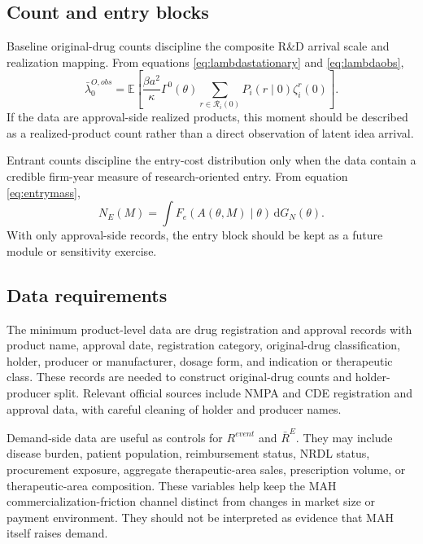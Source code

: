 \documentclass[12pt]{article}
\newcommand{\E}{\mathbb{E}}
\newcommand{\1}{\mathbf{1}}
\newcommand{\dd}{\mathrm{d}}
\newcommand{\calR}{\mathcal{R}}
\begin{document}
\subsection{Count and entry blocks}

Baseline original-drug counts discipline the composite R\&D arrival scale and realization mapping. From equations \eqref{eq:lambdastationary} and \eqref{eq:lambdaobs},
\begin{equation}
    \bar\lambda_0^{O,obs}
    =
    \E\left[
    \frac{\beta a^2}{\kappa}\Gamma^0(\theta)
    \sum_{r\in\calR_i(0)}P_i(r\mid0)\zeta_i^r(0)
    \right].
    \label{eq:arrival_scale}
\end{equation}
If the data are approval-side realized products, this moment should be described as a realized-product count rather than a direct observation of latent idea arrival.

Entrant counts discipline the entry-cost distribution only when the data contain a credible firm-year measure of research-oriented entry. From equation \eqref{eq:entrymass},
\begin{equation}
    N_E(M)=
    \int
    F_e\!\left(A(\theta,M)\mid\theta\right)
    \,\dd G_N(\theta).
    \label{eq:entry_calib}
\end{equation}
With only approval-side records, the entry block should be kept as a future module or sensitivity exercise.

\subsection{Data requirements}

The minimum product-level data are drug registration and approval records with product name, approval date, registration category, original-drug classification, holder, producer or manufacturer, dosage form, and indication or therapeutic class. These records are needed to construct original-drug counts and holder-producer split. Relevant official sources include NMPA and CDE registration and approval data, with careful cleaning of holder and producer names.

Demand-side data are useful as controls for $R^{event}$ and $\bar R^E$. They may include disease burden, patient population, reimbursement status, NRDL status, procurement exposure, aggregate therapeutic-area sales, prescription volume, or therapeutic-area composition. These variables help keep the MAH commercialization-friction channel distinct from changes in market size or payment environment. They should not be interpreted as evidence that MAH itself raises demand.
\end{document}
